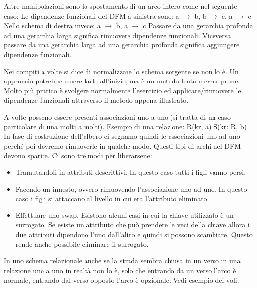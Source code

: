 Altre manipolazioni sono lo spostamento di un arco intero come nel seguente caso:
\noindent Le dipendenze funzionali del DFM a sinistra sono:\newline
a $\xrightarrow{}$ b, b $\xrightarrow{}$ c, a $\xrightarrow{}$ c\newline
Nello schema di destra invece:
a $\xrightarrow{}$ b, a $\xrightarrow{}$ c\newline
Passare da una gerarchia profonda ad una gerarchia larga significa rimuovere dipendenze funzionali. Viceversa passare da una gerarchia larga ad una gerarchia profonda significa aggiungere dipendenze funzionali.
\begin{warn}
	Nei compiti a volte si dice di normalizzare lo schema sorgente se non lo è. Un approccio potrebbe essere farlo all'inizio, ma è un metodo lento e error-prone. Molto più pratico è svolgere normalmente l'esercizio ed applicare/rimuovere le dipendenze funzionali attraverso il metodo appena illustrato.
\end{warn}
A volte possono essere presenti associazioni uno a uno (si tratta di un caso particolare di una molti a molti). Esempio di una relazione:\newline
R(\underline{kr}, a)\newline
S(\underline{kr}: R, b)\newline
{}
\noindent In fase di costruzione dell'albero ci segnamo quindi le associazioni uno ad uno perché poi dovremo rimuoverle in qualche modo. Questi tipi di archi nel DFM devono sparire. Ci sono tre modi per liberarsene:
\begin{itemize}
	\item Tramutandoli in attributi descrittivi. In questo caso tutti i figli vanno persi.
	\item Facendo un innesto, ovvero rimuovendo l'associazione uno ad uno. In questo caso i figli si attaccano al livello in cui era l'attributo eliminato.
	\item Effettuare uno swap. Esistono alcuni casi in cui la chiave utilizzato è un surrogato. Se esiste un attributo che può prendere le veci della chiave allora i due attributi dipendono l'uno dall'altro e quindi si possono scambiare. Questo rende anche possibile eliminare il surrogato.
\end{itemize}
\begin{warn}[]
	In uno schema relazionale anche se la strada sembra chiusa in un verso in una relazione uno a uno in realtà non lo è, solo che entrando da un verso l'arco è normale, entrando dal verso opposto l'arco è opzionale. Vedi esempio dei voli.
\end{warn}
